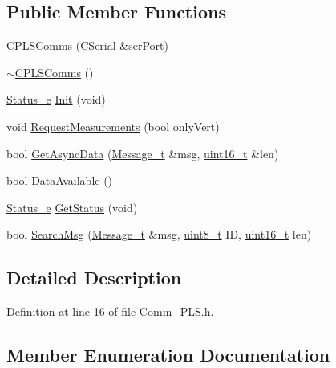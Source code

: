 \subsection*{Public Member Functions}
\begin{DoxyCompactItemize}
\item 
\mbox{\hyperlink{class_c_p_l_s_comms_ae1ec975e5e402b405389d47b8acd0a63}{C\+P\+L\+S\+Comms}} (\mbox{\hyperlink{class_c_serial}{C\+Serial}} \&ser\+Port)
\item 
\mbox{\hyperlink{class_c_p_l_s_comms_aac23966ff823f63a2ff524bbb706e549}{$\sim$\+C\+P\+L\+S\+Comms}} ()
\item 
\mbox{\hyperlink{class_c_p_l_s_comms_a765bc36363f75f4faf4fd2b41d440159}{Status\+\_\+e}} \mbox{\hyperlink{class_c_p_l_s_comms_ae7f8d87ea15de35a120d65a7a8bbbb76}{Init}} (void)
\item 
void \mbox{\hyperlink{class_c_p_l_s_comms_ae8f7e9acdf4243b76f3c7f61cf766cfc}{Request\+Measurements}} (bool only\+Vert)
\item 
bool \mbox{\hyperlink{class_c_p_l_s_comms_a3124eaa4549706962c7024c7c97e82b0}{Get\+Async\+Data}} (\mbox{\hyperlink{struct_c_p_l_s_comms_1_1_message__t}{Message\+\_\+t}} \&msg, \mbox{\hyperlink{_a_d_a_s___types_8h_a1f1825b69244eb3ad2c7165ddc99c956}{uint16\+\_\+t}} \&len)
\item 
bool \mbox{\hyperlink{class_c_p_l_s_comms_ae9d000eff184034954829d76162654a5}{Data\+Available}} ()
\item 
\mbox{\hyperlink{class_c_p_l_s_comms_a765bc36363f75f4faf4fd2b41d440159}{Status\+\_\+e}} \mbox{\hyperlink{class_c_p_l_s_comms_a05149da99ab80b804699763111315f33}{Get\+Status}} (void)
\item 
bool \mbox{\hyperlink{class_c_p_l_s_comms_ae0cd51de8a24b261389b6f89b4b80e51}{Search\+Msg}} (\mbox{\hyperlink{struct_c_p_l_s_comms_1_1_message__t}{Message\+\_\+t}} \&msg, \mbox{\hyperlink{_a_d_a_s___types_8h_aba7bc1797add20fe3efdf37ced1182c5}{uint8\+\_\+t}} ID, \mbox{\hyperlink{_a_d_a_s___types_8h_a1f1825b69244eb3ad2c7165ddc99c956}{uint16\+\_\+t}} len)
\end{DoxyCompactItemize}


\subsection{Detailed Description}


Definition at line 16 of file Comm\+\_\+\+P\+L\+S.\+h.



\subsection{Member Enumeration Documentation}
\mbox{\label{class_c_p_l_s_comms_a765bc36363f75f4faf4fd2b41d440159}} 

